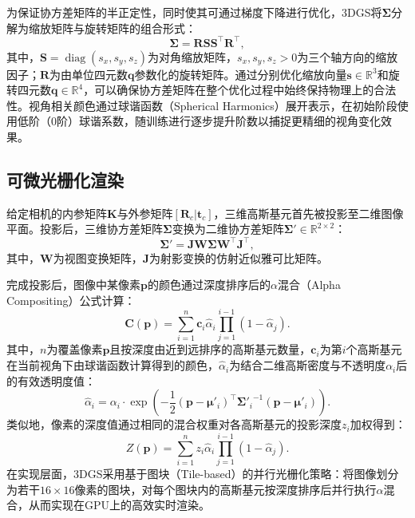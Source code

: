 为保证协方差矩阵的半正定性，同时使其可通过梯度下降进行优化，3DGS将$\boldsymbol{\Sigma}$分解为缩放矩阵与旋转矩阵的组合形式：
\begin{equation}
    \boldsymbol{\Sigma} = \mathbf{R}\mathbf{S}\mathbf{S}^{\top}\mathbf{R}^{\top},
    \label{eq:cov_decomp}
\end{equation}其中，$\mathbf{S} = \operatorname{diag}(s_x, s_y, s_z)$为对角缩放矩阵，$s_x, s_y, s_z > 0$为三个轴方向的缩放因子；$\mathbf{R}$为由单位四元数$\mathbf{q}$参数化的旋转矩阵。通过分别优化缩放向量$\mathbf{s} \in \mathbb{R}^3$和旋转四元数$\mathbf{q} \in \mathbb{R}^4$，可以确保协方差矩阵在整个优化过程中始终保持物理上的合法性。视角相关颜色通过球谐函数（Spherical Harmonics）展开表示，在初始阶段使用低阶（0阶）球谐系数，随训练进行逐步提升阶数以捕捉更精细的视角变化效果。

\subsection{可微光栅化渲染}

给定相机的内参矩阵$\mathbf{K}$与外参矩阵$[\mathbf{R}_c|\mathbf{t}_c]$，三维高斯基元首先被投影至二维图像平面。投影后，三维协方差矩阵$\boldsymbol{\Sigma}$变换为二维协方差矩阵$\boldsymbol{\Sigma}' \in \mathbb{R}^{2\times2}$：
\begin{equation}
    \boldsymbol{\Sigma}' = \mathbf{J}\mathbf{W}\boldsymbol{\Sigma}\mathbf{W}^{\top}\mathbf{J}^{\top},
    \label{eq:proj_cov}
\end{equation}其中，$\mathbf{W}$为视图变换矩阵，$\mathbf{J}$为射影变换的仿射近似雅可比矩阵。

完成投影后，图像中某像素$\mathbf{p}$的颜色通过深度排序后的$\alpha$混合（Alpha Compositing）公式计算：
\begin{equation}
    \mathbf{C}(\mathbf{p}) = \sum_{i=1}^{n} \mathbf{c}_i \hat{\alpha}_i \prod_{j=1}^{i-1}(1 - \hat{\alpha}_j).
    \label{eq:alpha_blend}
\end{equation}其中，$n$为覆盖像素$\mathbf{p}$且按深度由近到远排序的高斯基元数量，$\mathbf{c}_i$为第$i$个高斯基元在当前视角下由球谐函数计算得到的颜色，$\hat{\alpha}_i$为结合二维高斯密度与不透明度$\alpha_i$后的有效透明度值：
\begin{equation}
    \hat{\alpha}_i = \alpha_i \cdot \exp\!\left(-\frac{1}{2}(\mathbf{p} - \boldsymbol{\mu}'_i)^{\top} {\boldsymbol{\Sigma}'_i}^{-1} (\mathbf{p} - \boldsymbol{\mu}'_i)\right).
    \label{eq:eff_alpha}
\end{equation}类似地，像素的深度值通过相同的混合权重对各高斯基元的投影深度$z_i$加权得到：
\begin{equation}
    Z(\mathbf{p}) = \sum_{i=1}^{n} z_i \hat{\alpha}_i \prod_{j=1}^{i-1}(1 - \hat{\alpha}_j).
    \label{eq:depth_render}
\end{equation}在实现层面，3DGS采用基于图块（Tile-based）的并行光栅化策略：将图像划分为若干$16\times16$像素的图块，对每个图块内的高斯基元按深度排序后并行执行$\alpha$混合，从而实现在GPU上的高效实时渲染。

